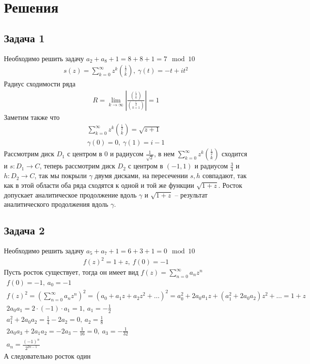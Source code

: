 
\newpage
\section*{Решения}
\subsection*{Задача 1}
	Необходимо решить задачу $a_2 + a_8 + 1 = 8 + 8 + 1 = 7 \mod 10$
	\begin{gather*}
		s(z) = \sum\limits_{k = 0}^{\infty} z^k {{\frac{1}{2}}\choose{k}},\ \gamma(t) = -t + it^2
	\end{gather*}
	Радиус сходимости ряда 
	\begin{gather*}
		R = \lim\limits_{k \to \infty} \left|\frac{{{\frac{1}{2}}\choose{k}}}{{{\frac{1}{2}}\choose{k+1}}}\right| = 1
	\end{gather*}
	Заметим также что
	\begin{gather*}
		\sum\limits_{k = 0}^{\infty} z^k {{\frac{1}{2}}\choose{k}} = \sqrt{z+1}\\
		\gamma(0) = 0,\ \gamma(1) = i-1
	\end{gather*}
	Рассмотрим диск $D_1$ с центром в $0$ и радиусом $\frac{1}{\sqrt{2}}$, в нем $\sum\limits_{k = 0}^{\infty} z^k {{\frac{1}{2}}\choose{k}}$ сходится и $s: D_1 \to C$, теперь рассмотрим диск $D_2$ с центром в $(-1,1)$ и радиусом $\frac{3}{4}$ и $h: D_2 \to C$, так мы покрыли $\gamma$ двумя дисками, на пересечении $s,h$ совпадают, так как в этой области оба ряда сходятся к одной и той же функции $\sqrt{1+z}$. Росток допускает аналитическое продолжение вдоль $\gamma$ и $\sqrt{1+z}$ -- результат аналитического продолжения вдоль $\gamma$.
\vskip 0.4in

\subsection*{Задача 2}
	Необходимо решить задачу $a_5 + a_7 + 1 = 6 + 3 + 1 = 0 \mod 10$
	\begin{gather*}
		f(z)^2 = 1 + z,\ f(0) = -1
	\end{gather*}
	Пусть росток существует, тогда он имеет вид $f(z) = \sum\limits_{n = 0}^{\infty} a_n z^n$
	\begin{gather*}
		f(0) = -1,\ a_0 = -1\\
		f(z)^2
		= \left(\sum\limits_{n = 0}^{\infty} a_n z^n\right)^2
		= (a_0 + a_1 z + a_2 z^2 + \ldots)^2
		= a_0^2 + 2a_0 a_1 z + (a_1^2 + 2a_0 a_2)z^2 + \ldots
		= 1 + z\\
		2a_0a_1 = 2 \cdot (-1) \cdot a_1 = 1,\ a_1 = -\frac{1}{2}\\
		a_1^2 + 2a_0a_2 = \frac{1}{4} - 2a_2 = 0,\ a_2 = \frac{1}{8}\\
		2a_0a_3 + 2a_1a_2 = -2a_3 - \frac{1}{16} = 0,\ a_3 = -\frac{1}{32}\\
		a_n = \frac{(-1)^n}{2^{2n-1}}
	\end{gather*}
	А следовательно росток один


